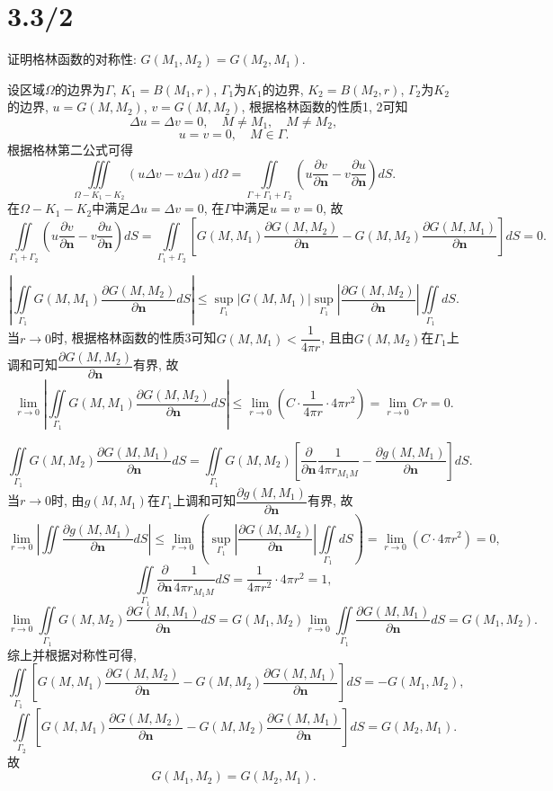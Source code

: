 \documentclass[11pt,a4paper]{article}
\author{刘逸灏 (515370910207)}
\begin{document}
\maketitle
\section{3.3/2}
\begin{problem}
证明格林函数的对称性: $G(M_1,M_2)=G(M_2,M_1)$.
\end{problem}
设区域$\Omega$的边界为$\Gamma$, $K_1=B(M_1,r)$, $\Gamma_1$为$K_1$的边界, $K_2=B(M_2,r)$, $\Gamma_2$为$K_2$的边界, $u=G(M,M_2)$, $v=G(M,M_2)$, 根据格林函数的性质1, 2可知
$$\Delta u=\Delta v=0, \quad M\neq M_1,\quad M\neq M_2,$$
$$u=v=0, \quad M\in\Gamma.$$
根据格林第二公式可得
$$\iiint\limits_{\Omega-K_1-K_2}(u\Delta v-v\Delta u) d\Omega=\iint\limits_{\Gamma+\Gamma_1+\Gamma_2}\left(u\frac{\partial v}{\partial\mathbf{n}}-v\frac{\partial u}{\partial\mathbf{n}}\right)dS.$$
在$\Omega-K_1-K_2$中满足$\Delta u=\Delta v=0$, 在$\Gamma$中满足$u=v=0$, 故
$$\iint\limits_{\Gamma_1+\Gamma_2}\left(u\frac{\partial v}{\partial\mathbf{n}}-v\frac{\partial u}{\partial\mathbf{n}}\right)dS=\iint\limits_{\Gamma_1+\Gamma_2}\left[G(M,M_1)\frac{\partial G(M,M_2)}{\partial\mathbf{n}}-G(M,M_2)\frac{\partial G(M,M_1)}{\partial\mathbf{n}}\right]dS=0.$$

$$\left|\iint\limits_{\Gamma_1}G(M,M_1)\frac{\partial G(M,M_2)}{\partial\mathbf{n}}dS\right|\leqslant\sup_{\Gamma_1}|G(M,M_1)|\sup_{\Gamma_1}\left|\frac{\partial G(M,M_2)}{\partial\mathbf{n}}\right|\iint\limits_{\Gamma_1}dS.$$
当$r\to0$时, 根据格林函数的性质3可知$G(M,M_1)<\dfrac{1}{4\pi r}$, 且由$G(M,M_2)$在$\Gamma_1$上调和可知$\dfrac{\partial G(M,M_2)}{\partial\mathbf{n}}$有界, 故
$$\lim_{r\to0}\left|\iint\limits_{\Gamma_1}G(M,M_1)\frac{\partial G(M,M_2)}{\partial\mathbf{n}}dS\right|\leqslant \lim_{r\to0}\left( C\cdot \frac{1}{4\pi r} \cdot 4\pi r^2\right)=\lim_{r\to0} Cr= 0.$$

$$\iint\limits_{\Gamma_1}G(M,M_2)\frac{\partial G(M,M_1)}{\partial\mathbf{n}}dS=\iint\limits_{\Gamma_1}G(M,M_2)\left[\frac{\partial}{\partial\mathbf{n}}\frac{1}{4\pi r_{M_1M}}-\frac{\partial g(M,M_1)}{\partial\mathbf{n}}\right]dS.$$
当$r\to0$时, 由$g(M,M_1)$在$\Gamma_1$上调和可知$\dfrac{\partial g(M,M_1)}{\partial\mathbf{n}}$有界, 故
$$\lim_{r\to0}\left|\iint\frac{\partial g(M,M_1)}{\partial\mathbf{n}}dS\right|\leqslant \lim_{r\to 0}\left(\sup_{\Gamma_1}\left|\frac{\partial G(M,M_2)}{\partial\mathbf{n}}\right|\iint\limits_{\Gamma_1}dS\right)=\lim_{r\to0}(C\cdot 4\pi r^2)=0,$$
$$\iint\limits_{\Gamma_1}\frac{\partial}{\partial\mathbf{n}}\frac{1}{4\pi r_{M_1M}}dS=\frac{1}{4\pi r^2}\cdot 4\pi r^2=1,$$
$$\lim_{r\to 0}\iint\limits_{\Gamma_1}G(M,M_2)\frac{\partial G(M,M_1)}{\partial\mathbf{n}}dS=G(M_1,M_2)\lim_{r\to 0}\iint\limits_{\Gamma_1}\frac{\partial G(M,M_1)}{\partial\mathbf{n}}dS=G(M_1,M_2).$$
综上并根据对称性可得,
$$\iint\limits_{\Gamma_1}\left[G(M,M_1)\frac{\partial G(M,M_2)}{\partial\mathbf{n}}-G(M,M_2)\frac{\partial G(M,M_1)}{\partial\mathbf{n}}\right]dS=-G(M_1,M_2),$$
$$\iint\limits_{\Gamma_2}\left[G(M,M_1)\frac{\partial G(M,M_2)}{\partial\mathbf{n}}-G(M,M_2)\frac{\partial G(M,M_1)}{\partial\mathbf{n}}\right]dS=G(M_2,M_1).$$
故
$$G(M_1,M_2)=G(M_2,M_1).$$
\end{document}
